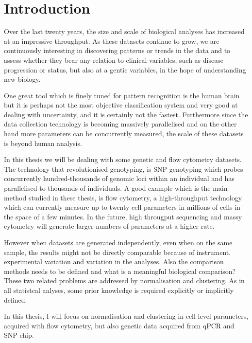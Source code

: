 %

\chapter[Introduction]{ \label{chapter:intro} Introduction}

Over the last twenty years, the size and scale of biological analyses has increased at an impressive throughput.
As these datasets continue to grow, we are continuously interesting in discovering patterns or trends in the data
and to assess whether they bear any relation to clinical variables, such as disease progression or status,
but also at a gentic variables, in the hope of understanding new biology.

One great tool which is finely tuned for pattern recognition is the human brain but it is perhaps not the most objective classification system
and very good at dealing with uncertainty, and it is certainly not the fastest.
Furthermore since the data collection technology is becoming massively parallelised
and on the other hand more parameters can be concurrently measured, the scale of these datasets is beyond human analysis.

In this thesis we will be dealing with some genetic and flow cytometry datasets.
The technology that revolutionised genotyping, is SNP genotyping which probes concurrently hundred-thousands of genomic loci within an individual and has parallelised
to thousands of individuals.
A good example which is the main method studied in these thesis, is flow cytometry, a high-throughput technology which can currently measure up to twenty cell
parameters in millions of cells in the space of a few minutes.
In the future, high througput sequencing and massy cytometry will generate larger numbers of parameters at a higher rate.

However when datasets are generated independently, even when on the same sample, the results might not be directly comparable because of
instrument, experimental variation and variation in the analyses.
Also the comparison methods needs to be defined and what is a meaningful biological comparison?
These two related problems are addressed by normalisation and clustering.
As in all statistcal anlyses, some prior knowledge is required explicitly or implicitly defined.

In this thesis, I will focus on normalisation and clustering in cell-level parameters, acquired with flow cytometry,
but also genetic data acquired from qPCR and SNP chip.

